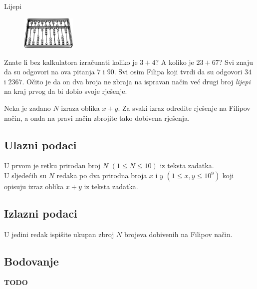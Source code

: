 \begin{statement}[
  problempoints=30,
  timelimit=1 sekunda,
  memorylimit=512 MiB,
]{Lijepi}

\setlength\intextsep{-0.1cm}
\begin{figure}
\centering
\includegraphics[width=0.23\textwidth]{img/abacus.png}
\end{figure}

Znate li bez kalkulatora izračunati koliko je $3+4$? A koliko je $23+67$? Svi
znaju da su odgovori na ova pitanja $7$ i $90$. Svi osim Filipa koji tvrdi da
su odgovori $34$ i $2367$. Očito je da on dva broja ne zbraja na ispravan način
već drugi broj \textit{lijepi} na kraj prvog da bi dobio svoje rješenje.

Neka je zadano $N$ izraza oblika $x+y$. Za svaki izraz odredite rješenje na
Filipov način, a onda na pravi način zbrojite tako dobivena rješenja.

\subsection*{Ulazni podaci}
U prvom je retku prirodan broj $N$ $(1 \le N \le 10)$ iz teksta zadatka. \\
U sljedećih su $N$ redaka po dva prirodna broja $x$ i $y$ $(1 \le x, y \le 10^9)$
koji opisuju izraz oblika $x+y$ iz teksta zadatka.

\subsection*{Izlazni podaci}
U jedini redak ispišite ukupan zbroj $N$ brojeva dobivenih na Filipov način.

\subsection*{Bodovanje}
\textbf{TODO}


\end{statement}

